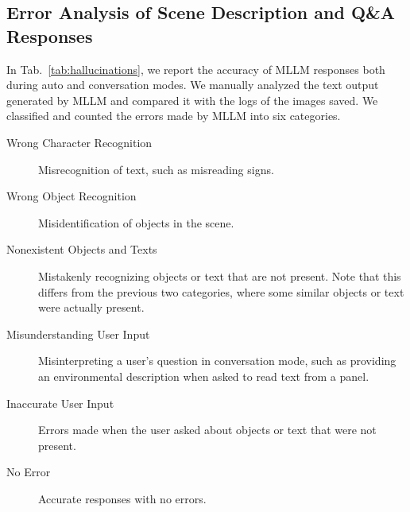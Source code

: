 \subsection{Error Analysis of Scene Description and Q\&A Responses}
\label{sec:error_analysis}
In Tab.~\ref{tab:hallucinations}, we report the accuracy of MLLM responses both during auto and conversation modes.
We manually analyzed the text output generated by MLLM and compared it with the logs of the images saved.
We classified and counted the errors made by MLLM into six categories.
\begin{description}
    \item[Wrong Character Recognition] Misrecognition of text, such as misreading signs.
    \item[Wrong Object Recognition] Misidentification of objects in the scene.
    \item[Nonexistent Objects and Texts] Mistakenly recognizing objects or text that are not present. Note that this differs from the previous two categories, where some similar objects or text were actually present.
    \item[Misunderstanding User Input] Misinterpreting a user’s question in conversation mode, such as providing an environmental description when asked to read text from a panel.
    \item[Inaccurate User Input] Errors made when the user asked about objects or text that were not present.
    \item[No Error] Accurate responses with no errors.
\end{description}


